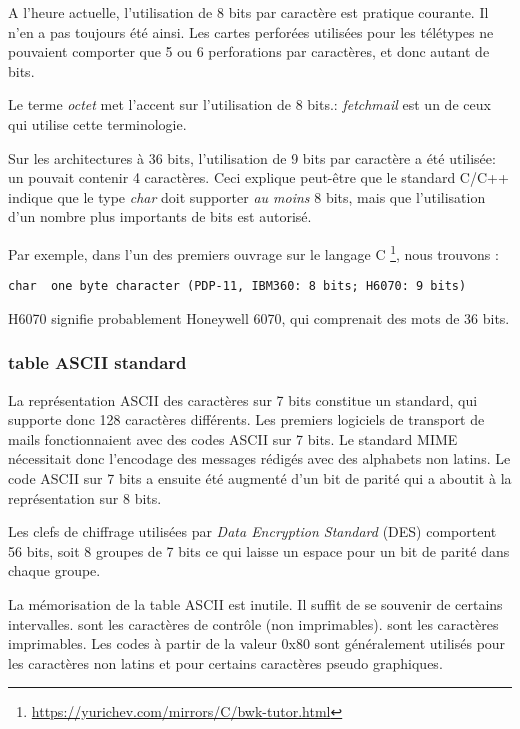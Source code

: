 A l'heure actuelle, l'utilisation de 8 bits par caractère est pratique courante.
Il n'en a pas toujours été ainsi.
Les cartes perforées utilisées pour les télétypes ne pouvaient comporter que 5 ou 6 perforations par caractères, et donc autant de bits.

Le terme \emph{octet} met l'accent sur l'utilisation de 8 bits.:
\emph{fetchmail} est un de ceux qui utilise cette terminologie.

Sur les architectures à 36 bits, l'utilisation de 9 bits par caractère a été utilisée: un  pouvait contenir 4 caractères.
Ceci explique peut-être que le standard C/C++ indique que le type \emph{char} doit supporter \emph{au moins} 8 bits, mais que l'utilisation
d'un nombre plus importants de bits est autorisé.

Par exemple, dans l'un des premiers ouvrage sur le langage C \footnote{\url{https://yurichev.com/mirrors/C/bwk-tutor.html}}, nous trouvons :

\begin{lstlisting}
char  one byte character (PDP-11, IBM360: 8 bits; H6070: 9 bits)
\end{lstlisting}

H6070 signifie probablement Honeywell 6070, qui comprenait des mots de 36 bits.

\subsubsection{table ASCII standard}

La représentation ASCII des caractères sur 7 bits constitue un standard, qui supporte donc 128 caractères différents.
Les premiers logiciels de transport de mails fonctionnaient avec des codes ASCII sur 7 bits.
Le standard \ac{MIME} nécessitait donc l'encodage des messages rédigés avec des alphabets non latins.
Le code ASCII sur 7 bits a ensuite été augmenté d'un bit de parité qui a aboutit à la représentation sur 8 bits.

Les clefs de chiffrage utilisées par \emph{Data Encryption Standard} (\ac{DES}) comportent 56 bits, soit 8 groupes de 7 bits
ce qui laisse un espace pour un bit de parité dans chaque groupe.

La mémorisation de la table \ac{ASCII} est inutile. Il suffit de se souvenir de certains intervalles.
 sont les caractères de contrôle (non imprimables).
 sont les caractères imprimables.
Les codes à partir de la valeur 0x80 sont généralement utilisés pour les caractères non latins et pour certains caractères pseudo graphiques.

